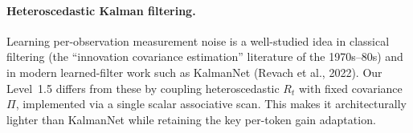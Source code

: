 \paragraph{Heteroscedastic Kalman filtering.} Learning per-observation
measurement noise is a well-studied idea in classical filtering (the
``innovation covariance estimation'' literature of the 1970s--80s) and
in modern learned-filter work such as KalmanNet (Revach et al., 2022).
Our Level~1.5 differs from these by coupling heteroscedastic $R_t$ with
fixed covariance $\Pi$, implemented via a single scalar associative
scan. This makes it architecturally lighter than KalmanNet while
retaining the key per-token gain adaptation.
